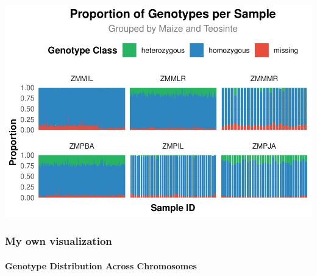 \documentclass[
]{article}
\begin{document}
\includegraphics{R_Assignment_files/figure-latex/unnamed-chunk-13-1.pdf}

\subsubsection{My own visualization}\label{my-own-visualization}

\paragraph{Genotype Distribution Across
Chromosomes}\label{genotype-distribution-across-chromosomes}
\end{document}
